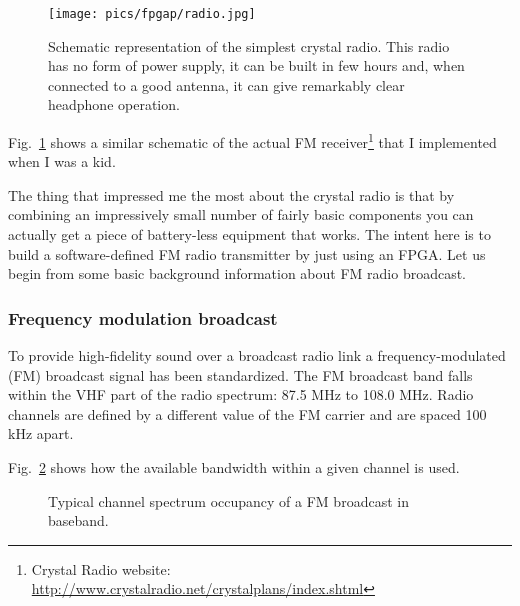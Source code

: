 \documentclass[13pt]{extreport}
\begin{document}
\begin{figure}[!b]
    \centering
	\texttt{[image: pics/fpgap/radio.jpg]}
	\caption{Schematic representation of the simplest crystal radio. This radio has no form of power supply, it can be built in few hours and, when connected to a good antenna, it can give remarkably clear headphone operation.}
	\label{radio}
\end{figure}

Fig.~\ref{radio} shows a similar schematic of the actual FM receiver\footnote{Crystal Radio website: \scriptsize\url{http://www.crystalradio.net/crystalplans/index.shtml}} that I implemented when I was a kid.

The thing that impressed me the most about the crystal radio is that by combining an impressively small number of fairly basic components you can actually get a piece of battery-less equipment that works. The intent here is to build a software-defined FM radio transmitter by just using an FPGA. Let us begin from some basic background information about FM radio broadcast.

\subsubsection{Frequency modulation broadcast}

To provide high-fidelity sound over a broadcast radio link a frequency-modulated (FM) broadcast signal has been standardized. The FM broadcast band falls within the VHF part of the radio spectrum: 87.5 MHz to 108.0 MHz. Radio channels are defined by a different value of the FM carrier and are spaced 100 kHz apart.

Fig.~\ref{fm_band} shows how the available bandwidth within a given channel is used.

\begin{figure}
    \centering
{}
\caption{Typical channel spectrum occupancy of a FM broadcast in baseband.}
\label{fm_band}
\end{figure}
\end{document}
